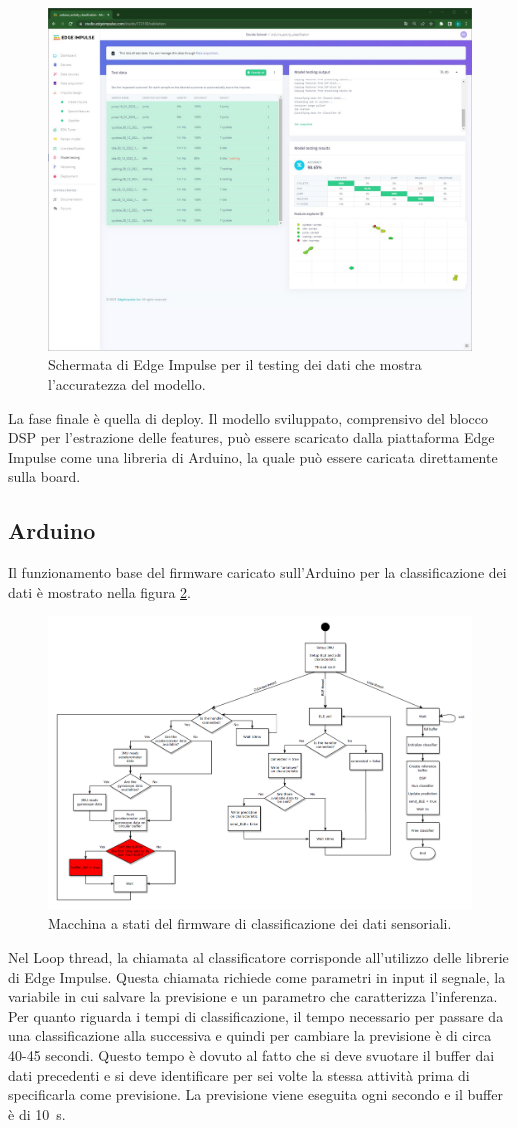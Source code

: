 \begin{figure}[h!]
	\centering
	\includegraphics[width=0.5\linewidth]{./ImageFiles/model_test.jpg}
	\caption{Schermata di Edge Impulse per il testing dei dati che mostra l'accuratezza del modello.}
	\label{fig:model_test}
\end{figure}

La fase finale è quella di deploy. Il modello sviluppato, comprensivo del blocco DSP per l'estrazione delle features, può essere scaricato dalla piattaforma Edge Impulse come una libreria di Arduino, la quale può essere caricata direttamente sulla board. 


\subsection{Arduino} \label{arduinoSect}
Il funzionamento base del firmware caricato sull'Arduino per la classificazione dei dati è mostrato nella figura \ref{fig:SM_classif}.
\begin{figure}[tbh]
	\centering
	\includegraphics[width=0.8\linewidth]{./ImageFiles/SM_classification}
	\caption{Macchina a stati del firmware di classificazione dei dati sensoriali.}
	\label{fig:SM_classif}
\end{figure}

\noindent
Nel Loop thread, la chiamata al classificatore corrisponde all'utilizzo delle librerie di Edge Impulse. Questa chiamata richiede come parametri in input il segnale, la variabile in cui salvare la previsione e un parametro che caratterizza l'inferenza. Per quanto riguarda i tempi di classificazione, il tempo necessario per passare da una classificazione alla successiva e quindi per cambiare la previsione è di circa 40-45 secondi. Questo tempo è dovuto al fatto che si deve svuotare il buffer dai dati precedenti e si deve identificare per sei volte la stessa attività prima di specificarla come previsione. La previsione viene eseguita ogni secondo e il buffer è di \SI{10}{\second}. 